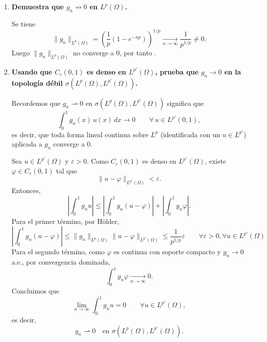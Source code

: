 \documentclass[12pt]{article}
\begin{document}
\begin{ejercicio}[4 puntos]
\begin{enumerate}[label=\alph*),resume]
        \item \textbf{Demuestra que $g_n\not\to 0$ en $L^p(\Omega)$.}
        
        Se tiene
        \begin{equation*}
        \|g_n\|_{L^p(\Omega)}
        =
        \left(\frac{1}{p}(1-e^{-np})\right)^{1/p}
        \xrightarrow[n\to\infty]{}
        \frac{1}{p^{1/p}}\neq 0.
        \end{equation*}
        Luego $\|g_n\|_{L^p(\Omega)}$ no converge a $0$, por tanto .
        
        \item \textbf{Usando que $C_c(0,1)$ es denso en $L^{p'}(\Omega)$, prueba que $g_n\to 0$
        en la topología débil $\sigma(L^p(\Omega),L^{p'}(\Omega))$.}

        Recordemos que $g_n \rightharpoonup 0$ en $\sigma(L^p(\Omega),L^{p'}(\Omega))$ significa que
        \[
        \int_0^1 g_n(x)\,u(x)\,dx \longrightarrow 0
        \qquad \forall\,u\in L^{p'}(0,1),
        \]
        es decir, que toda forma lineal continua sobre $L^p$ (identificada con un $u\in L^{p'}$) aplicada a $g_n$
        converge a $0$.
        
        Sea $u\in L^{p'}(\Omega)$ y $\varepsilon>0$. Como $C_c(0,1)$ es denso en $L^{p'}(\Omega)$,
        existe $\varphi\in C_c(0,1)$ tal que
        \begin{equation*}
        \|u-\varphi\|_{L^{p'}(\Omega)}<\varepsilon.
        \end{equation*}
        Entonces,
        \begin{equation*}
        \left|\int_0^1 g_n u\right|
        \le
        \left|\int_0^1 g_n (u-\varphi)\right|
        +
        \left|\int_0^1 g_n \varphi\right|.
        \end{equation*}
        Para el primer término, por Hölder,
        \begin{equation*}
        \left|\int_0^1 g_n (u-\varphi)\right|
        \le
        \|g_n\|_{L^p(\Omega)}\|u-\varphi\|_{L^{p'}(\Omega)}
        \le
        \frac{1}{p^{1/p}}\varepsilon \qquad \forall \varepsilon >0, \forall u \in L^{p'}(\Omega)
        \end{equation*}
        Para el segundo término, como $\varphi$ es continua con soporte compacto y $g_n\to 0$ a.e.,
        por convergencia dominada,
        \begin{equation*}
        \int_0^1 g_n \varphi \xrightarrow[n\to\infty]{} 0.
        \end{equation*}
        Concluimos que
        \begin{equation*}
        \lim_{n\to\infty}\int_0^1 g_n u = 0
        \qquad \forall u\in L^{p'}(\Omega),
        \end{equation*}        
        es decir,
        \begin{equation*}
        g_n \rightharpoonup 0
        \quad \text{en } \sigma(L^p(\Omega),L^{p'}(\Omega)).
        \end{equation*}
        \end{enumerate}
    \end{ejercicio}
    
\end{document}
